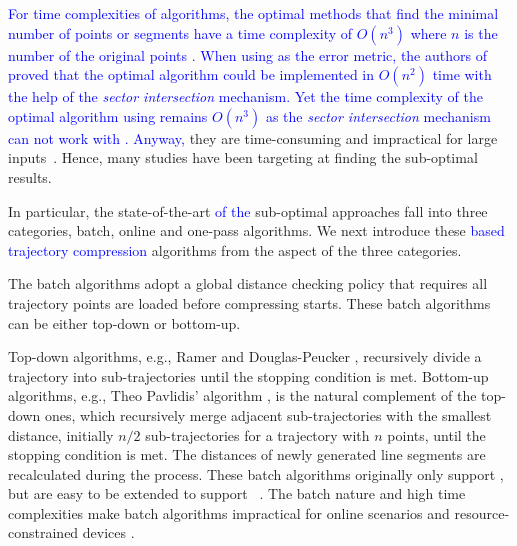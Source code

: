 \textcolor{blue}{For time complexities of \lsa algorithms, the optimal methods that find the minimal number of points or segments have a time complexity of $O(n^3)$ where $n$ is the number of the original points \cite{Imai:Optimal}. When using \ped as the error metric, the authors of \cite{Chan:Optimal} proved that the optimal algorithm could be implemented in $O(n^2)$ time with the help of the \textit{sector intersection} mechanism. Yet the time complexity of the optimal \lsa algorithm using \sed remains $O(n^3)$ as the \textit{sector intersection} mechanism can not work with \sed. Anyway,}
they are time-consuming and impractical for large inputs~\cite{Heckbert:Survey}. Hence, many studies have been targeting at finding the sub-optimal results.
%

In particular, the state-of-the-art \textcolor{blue}{of the} sub-optimal \lsa approaches fall into three categories, \ie batch, online and one-pass algorithms.
We next introduce these \lsa \textcolor{blue}{based trajectory compression} algorithms from the aspect of the three categories.

The batch algorithms adopt a global distance checking policy that requires all trajectory points are loaded before compressing starts.
These batch algorithms can be either top-down or bottom-up.

Top-down algorithms, e.g., Ramer \cite{Ramer:Split} and Douglas-Peucker \cite{Douglas:Peucker}, recursively divide a trajectory into sub-trajectories until the stopping condition is met.
%
Bottom-up algorithms, e.g., Theo Pavlidis' algorithm \cite{Pavlidis:Segment}, is the natural complement of the top-down ones, which recursively merge adjacent sub-trajectories with the smallest distance, initially $n/2$  sub-trajectories for a trajectory with $n$ points, until the stopping condition is met.
%
The distances of newly generated line segments are recalculated during the process.
%
These batch algorithms originally only support \ped, but are easy to be extended to support \sed~\cite{Meratnia:Spatiotemporal}.
%
The batch nature and high time complexities make batch algorithms impractical for online scenarios and resource-constrained devices \cite{Lin:Operb}.


